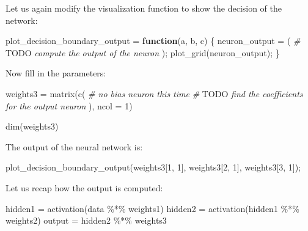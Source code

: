 \documentclass[
]{article}
\newenvironment{Shaded}{\begin{snugshade}}{\end{snugshade}}
\newcommand{\AlertTok}[1]{\textcolor[rgb]{0.94,0.16,0.16}{#1}}
\newcommand{\AttributeTok}[1]{\textcolor[rgb]{0.77,0.63,0.00}{#1}}
\newcommand{\CommentTok}[1]{\textcolor[rgb]{0.56,0.35,0.01}{\textit{#1}}}
\newcommand{\ControlFlowTok}[1]{\textcolor[rgb]{0.13,0.29,0.53}{\textbf{#1}}}
\newcommand{\DecValTok}[1]{\textcolor[rgb]{0.00,0.00,0.81}{#1}}
\newcommand{\FunctionTok}[1]{\textcolor[rgb]{0.00,0.00,0.00}{#1}}
\newcommand{\NormalTok}[1]{#1}
\newcommand{\OtherTok}[1]{\textcolor[rgb]{0.56,0.35,0.01}{#1}}
\newcommand{\SpecialCharTok}[1]{\textcolor[rgb]{0.00,0.00,0.00}{#1}}
\begin{document}
Let us again modify the visualization function to show the decision of
the network:

\begin{Shaded}
\begin{Highlighting}[]
\NormalTok{plot\_decision\_boundary\_output }\OtherTok{=} \ControlFlowTok{function}\NormalTok{(a, b, c) \{}
\NormalTok{  neuron\_output }\OtherTok{=}\NormalTok{ (}
    \CommentTok{\# }\AlertTok{TODO}\CommentTok{ compute the output of the neuron}
\NormalTok{  );}
  \FunctionTok{plot\_grid}\NormalTok{(neuron\_output);}
\NormalTok{\}}
\end{Highlighting}
\end{Shaded}

Now fill in the parameters:

\begin{Shaded}
\begin{Highlighting}[]
\NormalTok{weights3 }\OtherTok{=} \FunctionTok{matrix}\NormalTok{(}\FunctionTok{c}\NormalTok{(}
  \CommentTok{\# no bias neuron this time}
  \CommentTok{\# }\AlertTok{TODO}\CommentTok{ find the coefficients for the output neuron}
\NormalTok{), }\AttributeTok{ncol =} \DecValTok{1}\NormalTok{)}

\FunctionTok{dim}\NormalTok{(weights3)}
\end{Highlighting}
\end{Shaded}

The output of the neural network is:

\begin{Shaded}
\begin{Highlighting}[]
\FunctionTok{plot\_decision\_boundary\_output}\NormalTok{(weights3[}\DecValTok{1}\NormalTok{, }\DecValTok{1}\NormalTok{], weights3[}\DecValTok{2}\NormalTok{, }\DecValTok{1}\NormalTok{], weights3[}\DecValTok{3}\NormalTok{, }\DecValTok{1}\NormalTok{]);}
\end{Highlighting}
\end{Shaded}

Let us recap how the output is computed:

\begin{Shaded}
\begin{Highlighting}[]
\NormalTok{hidden1 }\OtherTok{=} \FunctionTok{activation}\NormalTok{(data }\SpecialCharTok{\%*\%}\NormalTok{ weights1)}
\NormalTok{hidden2 }\OtherTok{=} \FunctionTok{activation}\NormalTok{(hidden1 }\SpecialCharTok{\%*\%}\NormalTok{ weights2)}
\NormalTok{output }\OtherTok{=}\NormalTok{ hidden2 }\SpecialCharTok{\%*\%}\NormalTok{ weights3}
\end{Highlighting}
\end{Shaded}
\end{document}
